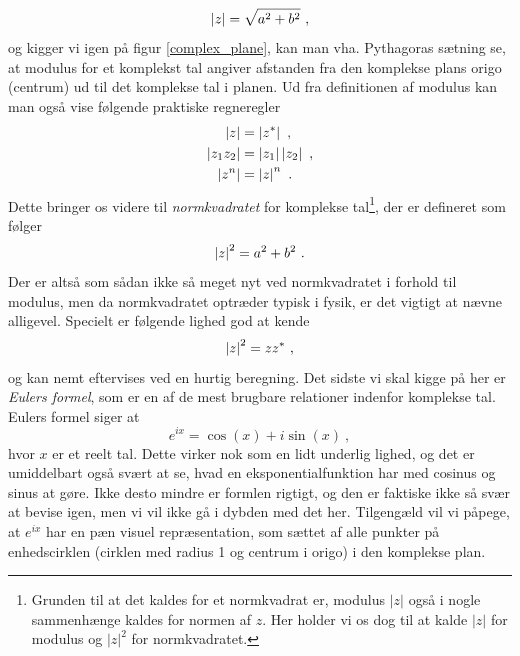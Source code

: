 \begin{equation}
\left| z \right| = \sqrt{a^2 + b^2} \ ,
\end{equation}
og kigger vi igen på figur \ref{complex_plane}, kan man vha. Pythagoras sætning se, at modulus for et komplekst tal angiver afstanden fra den komplekse plans origo (centrum) ud til det komplekse tal i planen. Ud fra definitionen af modulus kan man også vise følgende praktiske regneregler
\begin{align}
\left| z \right| &= \left| z^* \right|  \ , \label{modulus_regneregler1} \\
\left| z_1 z_2 \right| &= \left| z_1 \right| \left| z_2 \right| \ , \label{modulus_regneregler2} \\
\left| z^n \right| &= \left| z \right|^n \ . \label{modulus_regneregler3}
\end{align}
Dette bringer os videre til \emph{normkvadratet} for komplekse tal\footnote{Grunden til at det kaldes for et normkvadrat er, modulus $|z|$ også i nogle sammenhænge kaldes for normen af $z$. Her holder vi os dog til at kalde $|z|$ for modulus og $|z|^2$ for normkvadratet.}, der er defineret som følger
\begin{equation}
\label{normkvadrat}
\left| z \right|^2 = a^2 + b^2 \ .
\end{equation}
Der er altså som sådan ikke så meget nyt ved normkvadratet i forhold til modulus, men da normkvadratet optræder typisk i fysik, er det vigtigt at nævne alligevel. Specielt er følgende lighed god at kende
\begin{equation}
\label{normkvadrat2}
\left| z \right|^2 = zz^* \ ,
\end{equation} 
og kan nemt eftervises ved en hurtig beregning. Det sidste vi skal kigge på her er \emph{Eulers formel}, som er en af de mest brugbare relationer indenfor komplekse tal. Eulers formel siger at
\begin{equation}
\label{Eulers_formel}
e^{ix} = \cos(x) + i \sin(x) \ ,
\end{equation}
hvor $x$ er et reelt tal. Dette virker nok som en lidt underlig lighed, og det er umiddelbart også svært at se, hvad en eksponentialfunktion har med cosinus og sinus at gøre. Ikke desto mindre er formlen rigtigt, og den er faktiske ikke så svær at bevise igen, men vi vil ikke gå i dybden med det her. Tilgengæld vil vi påpege, at $e^{ix}$ har en pæn visuel repræsentation, som sættet af alle punkter på enhedscirklen (cirklen med radius 1 og centrum i origo) i den komplekse plan.  

